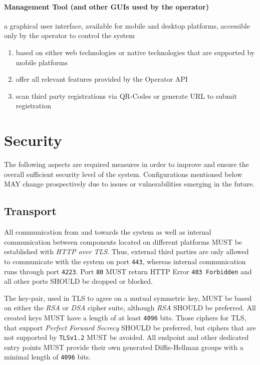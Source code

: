 \documentclass[12pt,english,a4paper,titlepage,cleardoublepage=empty,dottedtoc]{report}
\providecommand{\tightlist}{%
  \setlength{\itemsep}{0pt}\setlength{\parskip}{0pt}}
\begin{document}
\paragraph{Management Tool (and other GUIs used by the
operator)}\label{management-tool-and-other-guis-used-by-the-operator}

a graphical user interface, available for mobile and desktop platforms,
accessible only by the operator to control the system

\begin{enumerate}
\def\labelenumi{\alph{enumi})}
\tightlist
\item
  based on either web technologies or native technologies that are
  supported by mobile platforms
\item
  offer all relevant features provided by the Operator API
\item
  scan third party registrations via QR-Codes or generate URL to submit
  registration
\end{enumerate}

\section{Security}\label{security}

The following aspects are required measures in order to improve and
ensure the overall sufficient security level of the system.
Configurations mentioned below MAY change prospectively due to issues or
vulnerabilities emerging in the future.

\subsection{Transport}\label{transport}

All communication from and towards the system as well as internal
communication between components located on different platforms MUST be
established with \emph{HTTP over TLS}. Thus, external third parties are
only allowed to communicate with the system on port \texttt{443},
whereas internal communication runs through port \texttt{4223}. Port
\texttt{80} MUST return HTTP Error \texttt{403\ Forbidden} and all other
ports SHOULD be dropped or blocked.

The key-pair, used in TLS to agree on a mutual symmetric key, MUST be
based on either the \emph{RSA} or \emph{DSA} cipher suite, although
\emph{RSA} SHOULD be preferred. All created keys MUST have a length of
at least \texttt{4096} bits. Those ciphers for TLS, that support
\emph{Perfect Forward Secrecy} SHOULD be preferred, but ciphers that are
not supported by \texttt{TLSv1.2} MUST be avoided. All endpoint and
other dedicated entry points MUST provide their own generated
Diffie-Hellman groups with a minimal length of \texttt{4096} bits.
\end{document}
